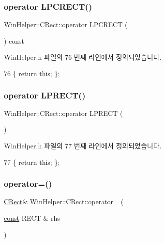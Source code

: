 \subsubsection{\texorpdfstring{operator L\+P\+C\+R\+E\+C\+T()}{operator LPCRECT()}}
{\footnotesize\ttfamily Win\+Helper\+::\+C\+Rect\+::operator L\+P\+C\+R\+E\+CT (\begin{DoxyParamCaption}{ }\end{DoxyParamCaption}) const\hspace{0.3cm}{\ttfamily [inline]}}



Win\+Helper.\+h 파일의 76 번째 라인에서 정의되었습니다.


\begin{DoxyCode}
76 \{ \textcolor{keywordflow}{return} \textcolor{keyword}{this}; \};
\end{DoxyCode}
\mbox{\label{class_win_helper_1_1_c_rect_af8af272cf417faeddfba92f44a8b6cb9}} 
\subsubsection{\texorpdfstring{operator L\+P\+R\+E\+C\+T()}{operator LPRECT()}}
{\footnotesize\ttfamily Win\+Helper\+::\+C\+Rect\+::operator L\+P\+R\+E\+CT (\begin{DoxyParamCaption}{ }\end{DoxyParamCaption})\hspace{0.3cm}{\ttfamily [inline]}}



Win\+Helper.\+h 파일의 77 번째 라인에서 정의되었습니다.


\begin{DoxyCode}
77 \{ \textcolor{keywordflow}{return} \textcolor{keyword}{this}; \};
\end{DoxyCode}
\mbox{\label{class_win_helper_1_1_c_rect_a138cae1d90a65763cb419e158b4c5dda}} 
\subsubsection{\texorpdfstring{operator=()}{operator=()}}
{\footnotesize\ttfamily \mbox{\hyperlink{class_win_helper_1_1_c_rect}{C\+Rect}}\& Win\+Helper\+::\+C\+Rect\+::operator= (\begin{DoxyParamCaption}\item[{\mbox{\hyperlink{getopt1_8c_a2c212835823e3c54a8ab6d95c652660e}{const}} R\+E\+CT \&}]{rhs }\end{DoxyParamCaption})\hspace{0.3cm}{\ttfamily [inline]}}



